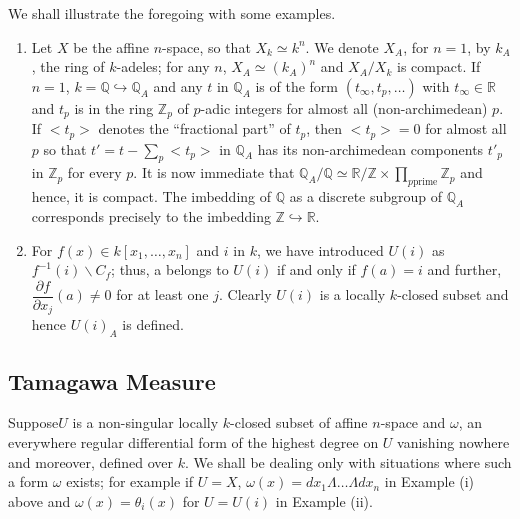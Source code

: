 We shall illustrate the foregoing with some examples.
\begin{enumerate}
\renewcommand{\theenumi}{\roman{enumi}}
\renewcommand{\labelenumi}{(\theenumi)}
\item Let $X$ be the affine $n$-space, so that $X_{k}\simeq k^{n}$. We
  denote $X_{A}$, for $n=1$, by $k_{A}$, the ring of $k$-adeles; for
  any $n$, $X_{A}\simeq (k_{A})^{n}$ and $X_{A}/X_{k}$ is compact. If
  $n=1$, $k=\mathbb{Q}\hookrightarrow \mathbb{Q}_{A}$ and any $t$ in
  $\mathbb{Q}_{A}$ is of the form $(t_{\infty},t_{p},\ldots)$ with
  $t_{\infty}\in \mathbb{R}$ and $t_{p}$ is in the ring
  $\mathbb{Z}_{p}$ of $p$-adic integers for almost all
  (non-archimedean) $p$. If $<t_{p}>$ denotes the ``fractional part''
  of $t_{p}$, then $<t_{p}>=0$ for almost all $p$ so that
  $t'=t-\sum\limits_{p}<t_{p}>$ in $\mathbb{Q}_{A}$ has its
  non-archimedean components $t'_{p}$ in $\mathbb{Z}_{p}$ for every
  $p$. It is now immediate that $\mathbb{Q}_{A}/\mathbb{Q}\simeq
  \mathbb{R}/\mathbb{Z}\times \prod\limits_{p\text{
      prime}}\mathbb{Z}_{p}$ and hence, it is compact. The imbedding
  of $\mathbb{Q}$ as a discrete subgroup of $\mathbb{Q}_{A}$
  corresponds precisely to the imbedding $\mathbb{Z}\hookrightarrow
  \mathbb{R}$. 

\item For $f(x)\in k[x_{1},\ldots,x_{n}]$ and $i$ in $k$, we have
  introduced $U(i)$ as $f^{-1}(i)\backslash C_{f}$; thus, a belongs to
  $U(i)$ if and only if $f(a)=i$ and further, $\dfrac{\partial
    f}{\partial x_{j}}(a)\neq 0$ for at least one $j$. Clearly $U(i)$
  is a locally $k$-closed subset and hence $U(i)_{A}$ is defined.
\end{enumerate}

\subsection{Tamagawa Measure}\label{chap4:sec1:subsec4} %

Suppose\pageoriginale $U$ is a non-singular locally $k$-closed subset of affine
$n$-space and $\omega$, an everywhere regular differential form of the
highest degree on $U$ vanishing nowhere and moreover, defined over
$k$. We shall be dealing only with situations where such a form
$\omega$ exists; for example if $U=X$,
$\omega(x)=dx_{1}\Lambda\ldots\Lambda dx_{n}$ in Example (i) above and
$\omega(x)=\theta_{i}(x)$ for $U=U(i)$ in Example (ii).

